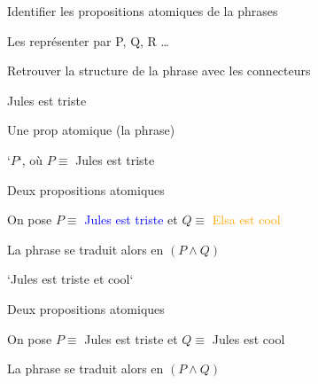 \begin{frame}

	\begin{description}[labelindent=6pt,style=multiline,leftmargin=1.3in]
		 \setlength\itemsep{1.4em}
		 
		 \item[En gros] Identifier les propositions atomiques de la phrases
		 
		 \item[] Les représenter par P, Q, R \dots
		 \item[] Retrouver la structure de la phrase avec les connecteurs\pause
		 \item[Exemple] Jules est triste\pause
		 \item[] Une prop atomique (la phrase)\pause
		 \item[Traduction] `$P$`, où $P \equiv$ Jules est triste
	\end{description}

\end{frame}


\begin{frame}

\pause\newline

Deux propositions atomiques\pause\pause\newline

On pose $P \equiv $ \textcolor{blue}{Jules est triste} et $Q \equiv $ \textcolor{orange}{Elsa est cool}\pause\newline

La phrase se traduit alors en $(P \wedge Q)$

\end{frame}


\begin{frame}

`Jules est triste et cool`\pause\newline

Deux propositions atomiques\pause\newline

On pose $P \equiv $ Jules est triste et $Q \equiv $ Jules est cool\pause\newline

La phrase se traduit alors en $(P \wedge Q)$

\end{frame}

